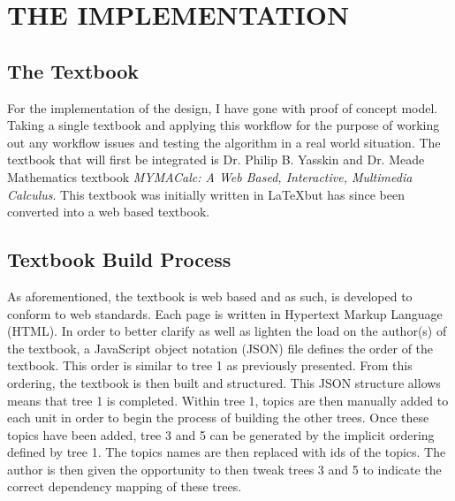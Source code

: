 %
%
%
%

\chapter{THE IMPLEMENTATION}

\section{The Textbook}

For the implementation of the design, I have gone with proof of concept model. Taking a single textbook and applying this workflow for the purpose of working out any workflow issues and testing the algorithm in a real world situation. The textbook that will first be integrated is Dr. Philip B. Yasskin and Dr. Meade Mathematics textbook \textit{MYMACalc: A Web Based, Interactive, Multimedia Calculus}. This textbook was initially written in \LaTeX\;but has since been converted into a web based textbook.

\section{Textbook Build Process}

As aforementioned, the textbook is web based and as such, is developed to conform to web standards. Each page is written in Hypertext Markup Language (HTML). In order to better clarify as well as lighten the load on the author(s) of the textbook, a JavaScript object notation (JSON) file defines the order of the textbook. This order is similar to tree 1 as previously presented. From this ordering, the textbook is then built and structured. This JSON structure allows means that tree 1 is completed. Within tree 1, topics are then manually added to each unit in order to begin the process of building the other trees. Once these topics have been added, tree 3 and 5 can be generated by the implicit ordering defined by tree 1. The topics names are then replaced with ids of the topics. The author is then given the opportunity to then tweak trees 3 and 5 to indicate the correct dependency mapping of these trees. 


